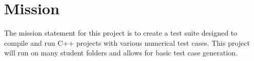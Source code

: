 
\chapter{Mission}

The mission statement for this project is to create a test suite designed to compile and run C++ projects with various numerical test cases. This project will run on many student folders and allows for basic test case generation.